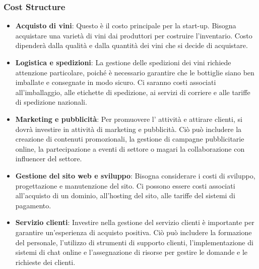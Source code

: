 \documentclass[12pt, a4paper]{article}
\begin{document}
\subsubsection{Cost Structure}
\begin{itemize}
    \item \textbf{Acquisto di vini}: Questo è il costo principale per la start-up. Bisogna acquistare una varietà di vini dai produttori per costruire l'inventario. Costo dipenderà dalla qualità e dalla quantità dei vini che si decide di acquistare.
    \item \textbf{Logistica e spedizioni}: La gestione delle spedizioni dei vini richiede attenzione particolare, poiché è necessario garantire che le bottiglie siano ben imballate e consegnate in modo sicuro. Ci saranno costi associati all'imballaggio, alle etichette di spedizione, ai servizi di corriere e alle tariffe di spedizione nazionali.
    \item \textbf{Marketing e pubblicità}: Per promuovere l' attività e attirare clienti, si dovrà investire in attività di marketing e pubblicità. Ciò può includere la creazione di contenuti promozionali, la gestione di campagne pubblicitarie online, la partecipazione a eventi di settore o magari la collaborazione con influencer del settore.
    \item \textbf{Gestione del sito web e sviluppo}: Bisogna considerare i costi di sviluppo, progettazione e manutenzione del sito. Ci possono essere costi associati all'acquisto di un dominio, all'hosting del sito, alle tariffe del sistemi di pagamento.
    \item \textbf{Servizio clienti}: Investire nella gestione del servizio clienti è importante per garantire un'esperienza di acquisto positiva. Ciò può includere la formazione del personale, l'utilizzo di strumenti di supporto clienti, l'implementazione di sistemi di chat online e l'assegnazione di risorse per gestire le domande e le richieste dei clienti.
\end{itemize}
\end{document}
